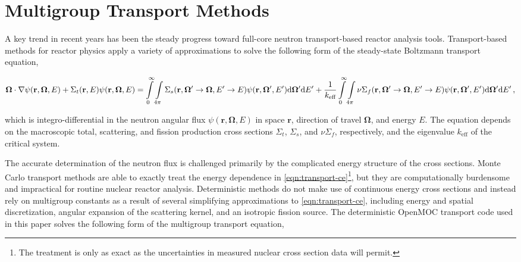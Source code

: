 \section{Multigroup Transport Methods}
\label{sec:mg-theory}

A key trend in recent years has been the steady progress toward full-core neutron transport-based reactor analysis tools. Transport-based methods for reactor physics apply a variety of approximations to solve the following form of the steady-state Boltzmann transport equation,

\begin{dmath}
\label{eqn:transport-ce}
\mathbf{\Omega} \cdot \nabla \psi(\mathbf{r},\mathbf{\Omega},E) + \Sigma_{t}(\mathbf{r},E)\psi(\mathbf{r},\mathbf{\Omega},E) = \int\displaylimits_{0}^{\infty}\int\displaylimits_{4\pi} \Sigma_{s}(\mathbf{r},{\mathbf{\Omega'}\rightarrow\mathbf{\Omega}},{E'\rightarrow E}) \psi(\mathbf{r},\mathbf{\Omega'},E') \mathrm{d}\mathbf{\Omega'} \mathrm{d}E' + \frac{1}{k_{\textrm{eff}}}\int\displaylimits_{0}^{\infty}\int\displaylimits_{4\pi} \nu\Sigma_{f}(\mathbf{r},{\mathbf{\Omega'}\rightarrow \mathbf{\Omega}},{E'\rightarrow E})\psi(\mathbf{r},\mathbf{\Omega'},E') \mathrm{d}\mathbf{\Omega'} \mathrm{d}E'\,,
\end{dmath}

\noindent which is integro-differential in the neutron angular flux $\psi(\mathbf{r},\mathbf{\Omega},E)$ in space $\mathbf{r}$, direction of travel $\mathbf{\Omega}$, and energy $E$. The equation depends on the macroscopic total, scattering, and fission production cross sections $\Sigma_{t}$, $\Sigma_{s}$, and $\nu\Sigma_{f}$, respectively, and the eigenvalue $k_{\textrm{eff}}$ of the critical system.

The accurate determination of the neutron flux is challenged primarily by the complicated energy structure of the cross sections. Monte Carlo transport methods are able to exactly treat the energy dependence in \cref{eqn:transport-ce}\footnote{The treatment is only as exact as the uncertainties in measured nuclear cross section data will permit.}, but they are computationally burdensome and impractical for routine nuclear reactor analysis. Deterministic methods do not make use of continuous energy cross sections and instead rely on multigroup constants as a result of several simplifying approximations to \cref{eqn:transport-ce}, including energy and spatial discretization, angular expansion of the scattering kernel, and an isotropic fission source. The deterministic OpenMOC transport code used in this paper solves the following form of the multigroup transport equation,

